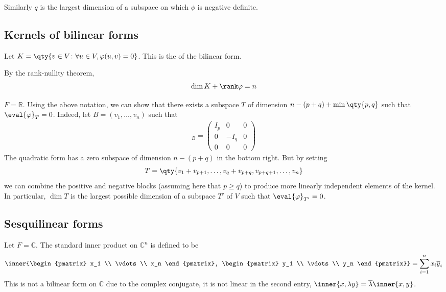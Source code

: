 \begin{remark}
	Similarly $q$ is the largest dimension of a subspace on which $\phi$ is negative definite.
\end{remark} 

\subsection{Kernels of bilinear forms}
\begin{definition}[Kernel]
	Let $K = \qty{ v \in V \colon \forall u \in V, \phi(u,v) = 0 }$.
	This is the  of the bilinear form.
\end{definition}
\begin{remark}
	By the rank-nullity theorem,
	\begin{align*}
		\dim K + \rank \phi = n
	\end{align*}

	$F = \mathbb{R}$. Using the above notation, we can show that there exists a subspace $T$ of dimension $n - (p+q) + \min\qty{p,q}$ such that $\eval{\phi}_T = 0$.
	Indeed, let $B = (v_1, \dots, v_n)$ such that
	\begin{align*}
		[\phi]_B = \begin{pmatrix}
			I_p & 0    & 0 \\
			0   & -I_q & 0 \\
			0   & 0    & 0
		\end{pmatrix}
	\end{align*}
	The quadratic form has a zero subspace of dimension $n - (p+q)$ in the bottom right.
	But by setting
	\begin{align*}
		T = \qty{v_1 + v_{p+1}, \dots, v_q + v_{p+q}, v_{p+q+1}, \dots, v_n}
	\end{align*}
	we can combine the positive and negative blocks (assuming here that $p \geq q$) to produce more linearly independent elements of the kernel.
	In particular, $\dim T$ is the largest possible dimension of a subspace $T'$ of $V$ such that $\eval{\phi}_{T'} = 0$.
\end{remark}

\subsection{Sesquilinear forms}
Let $F = \mathbb C$.
The standard inner product on $\mathbb C^n$ is defined to be
\begin{align*}
	\inner{\begin{pmatrix} x_1 \\ \vdots \\ x_n \end{pmatrix}, \begin{pmatrix} y_1 \\ \vdots \\ y_n \end{pmatrix}} = \sum_{i=1}^n x_i \overline y_i
\end{align*}
This is not a bilinear form on $\mathbb C$ due to the complex conjugate, it is not linear in the second entry, $\inner{x, \lambda y} = \overline \lambda \inner{x, y}$.

